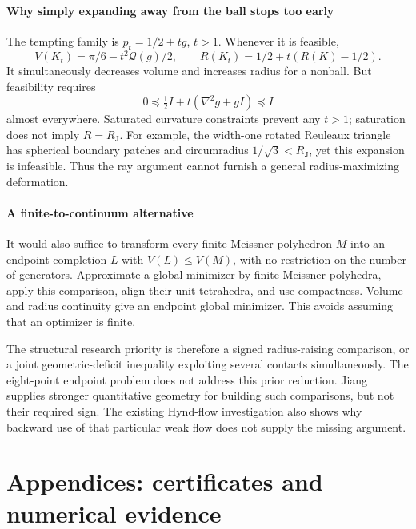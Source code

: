 \documentclass[11pt]{article}
\theoremstyle{remark}\newtheorem{remark}[theorem]{Remark}
\newcommand{\RJ}{R_{\mathrm J}}
\newcommand{\Q}{\mathcal Q}
\begin{document}
\subsection{Why simply expanding away from the ball stops too early}
The tempting family is $p_t=1/2+t g$, $t>1$. Whenever it is feasible,
\[
 V(K_t)=\pi/6-t^2\Q(g)/2,
 \qquad R(K_t)=1/2+t(R(K)-1/2).
\]
It simultaneously decreases volume and increases radius for a nonball.
But feasibility requires
\[
 0\preceq\tfrac12 I+t(\nabla^2g+gI)\preceq I
\]
almost everywhere. Saturated curvature constraints prevent any $t>1$;
saturation does not imply $R=\RJ$. For example, the width-one rotated
Reuleaux triangle has spherical boundary patches and circumradius
$1/\sqrt3<\RJ$, yet this expansion is infeasible. Thus the ray argument
cannot furnish a general radius-maximizing deformation.

\subsection{A finite-to-continuum alternative}
It would also suffice to transform every finite Meissner polyhedron $M$
into an endpoint completion $L$ with $V(L)\leq V(M)$, with no restriction
on the number of generators. Approximate a global minimizer by finite
Meissner polyhedra, apply this comparison, align their unit tetrahedra,
and use compactness. Volume and radius continuity give an endpoint
global minimizer. This avoids assuming that an optimizer is finite.

The structural research priority is therefore a signed radius-raising
comparison, or a joint geometric-deficit inequality exploiting several
contacts simultaneously. The eight-point endpoint problem does not
address this prior reduction. Jiang supplies stronger quantitative
geometry for building such comparisons, but not their required sign.
The existing Hynd-flow investigation also shows why backward use of
that particular weak flow does not supply the missing argument.


\appendix
\part*{Appendices: certificates and numerical evidence}
\end{document}
